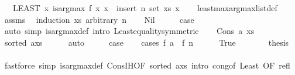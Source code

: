 \begin{isabellebody}
\ \ {\isacharequal}{\kern0pt}\ {\isacharparenleft}{\kern0pt}LEAST\ x{\isachardot}{\kern0pt}\ is{\isacharunderscore}{\kern0pt}arg{\isacharunderscore}{\kern0pt}max\ f\ {\isacharparenleft}{\kern0pt}{\isasymlambda}x{\isachardot}{\kern0pt}\ x\ {\isasymin}\ insert\ n\ {\isacharparenleft}{\kern0pt}set\ xs{\isacharparenright}{\kern0pt}{\isacharparenright}{\kern0pt}\ x{\isacharparenright}{\kern0pt}{\isachardoublequoteclose}\isanewline
%
\isadelimproof
\ \ %
\endisadelimproof
%
\isatagproof
{}\isamarkupfalse%
\ least{\isacharunderscore}{\kern0pt}max{\isacharunderscore}{\kern0pt}arg{\isacharunderscore}{\kern0pt}max{\isacharunderscore}{\kern0pt}list{\isacharunderscore}{\kern0pt}def\isanewline
\ \ \isamarkupfalse%
\ assms\ \isamarkupfalse%
\ {\isacharparenleft}{\kern0pt}induction\ xs\ arbitrary{\isacharcolon}{\kern0pt}\ n{\isacharparenright}{\kern0pt}\isanewline
\ \ \isamarkupfalse%
\ Nil\isanewline
\ \ \isamarkupfalse%
\ \isamarkupfalse%
\ {\isacharquery}{\kern0pt}case\isanewline
\ \ \ \ \isamarkupfalse%
\ {\isacharparenleft}{\kern0pt}auto\ simp{\isacharcolon}{\kern0pt}\ is{\isacharunderscore}{\kern0pt}arg{\isacharunderscore}{\kern0pt}max{\isacharunderscore}{\kern0pt}def\ intro{\isacharbang}{\kern0pt}{\isacharcolon}{\kern0pt}\ Least{\isacharunderscore}{\kern0pt}equality{\isacharbrackleft}{\kern0pt}symmetric{\isacharbrackright}{\kern0pt}{\isacharparenright}{\kern0pt}\isanewline
{}\isamarkupfalse%
\isanewline
\ \ \isamarkupfalse%
\ {\isacharparenleft}{\kern0pt}Cons\ a\ xs{\isacharparenright}{\kern0pt}\isanewline
\ \ \isamarkupfalse%
\ {\isachardoublequoteopen}sorted\ {\isacharparenleft}{\kern0pt}a{\isacharhash}{\kern0pt}xs{\isacharparenright}{\kern0pt}{\isachardoublequoteclose}\isanewline
\ \ \ \ \isamarkupfalse%
\ auto\isanewline
\ \ \isamarkupfalse%
\ \isamarkupfalse%
\ {\isacharquery}{\kern0pt}case\isanewline
\ \ \isamarkupfalse%
\ {\isacharparenleft}{\kern0pt}cases\ {\isachardoublequoteopen}f\ a\ {\isachargreater}{\kern0pt}\ f\ n{\isachardoublequoteclose}{\isacharparenright}{\kern0pt}\isanewline
\ \ \ \ \isamarkupfalse%
\ True\isanewline
\ \ \ \ \isamarkupfalse%
\ \isamarkupfalse%
\ {\isacharquery}{\kern0pt}thesis\isanewline
\ \ \ \ \ \ \isamarkupfalse%
\ {\isacharparenleft}{\kern0pt}fastforce\ simp{\isacharcolon}{\kern0pt}\ is{\isacharunderscore}{\kern0pt}arg{\isacharunderscore}{\kern0pt}max{\isacharunderscore}{\kern0pt}def\ Cons{\isachardot}{\kern0pt}IH{\isacharbrackleft}{\kern0pt}OF\ {\isacartoucheopen}sorted\ {\isacharparenleft}{\kern0pt}a{\isacharhash}{\kern0pt}xs{\isacharparenright}{\kern0pt}{\isacartoucheclose}{\isacharbrackright}{\kern0pt}\ intro{\isacharbang}{\kern0pt}{\isacharcolon}{\kern0pt}\ cong{\isacharbrackleft}{\kern0pt}of\ Least{\isacharcomma}{\kern0pt}\ OF\ refl{\isacharbrackright}{\kern0pt}{\isacharparenright}{\kern0pt}\isanewline

\end{isabellebody}
